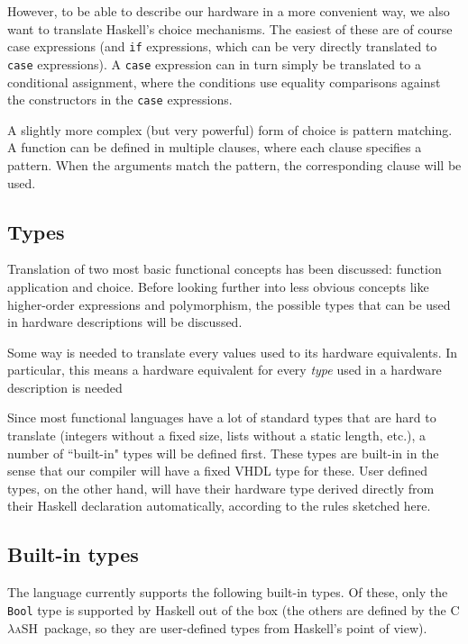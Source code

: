 \documentclass[conference,pdf,a4paper,10pt,final,twoside,twocolumn]{IEEEtran}
\def\CLaSH{\textsc{C$\lambda$aSH}}
\def\hs#1{\texttt{#1}}
\def\quote#1{``{#1}"}
\begin{document}
    However, to be able to describe our hardware in a more convenient
    way, we also want to translate Haskell's choice mechanisms. The
    easiest of these are of course case expressions (and \hs{if}
    expressions, which can be very directly translated to \hs{case}
    expressions). A \hs{case} expression can in turn simply be
    translated to a conditional assignment, where the conditions use
    equality comparisons against the constructors in the \hs{case}
    expressions.

    A slightly more complex (but very powerful) form of choice is
    pattern matching. A function can be defined in multiple clauses,
    where each clause specifies a pattern. When the arguments match the
    pattern, the corresponding clause will be used.

  \subsection{Types}
    Translation of two most basic functional concepts has been
    discussed: function application and choice. Before looking further
    into less obvious concepts like higher-order expressions and
    polymorphism, the possible types that can be used in hardware
    descriptions will be discussed.

    Some way is needed to translate every values used to its hardware
    equivalents. In particular, this means a hardware equivalent for
    every \emph{type} used in a hardware description is needed

    Since most functional languages have a lot of standard types that
    are hard to translate (integers without a fixed size, lists without
    a static length, etc.), a number of \quote{built-in} types will be
    defined first. These types are built-in in the sense that our
    compiler will have a fixed VHDL type for these. User defined types,
    on the other hand, will have their hardware type derived directly
    from their Haskell declaration automatically, according to the rules
    sketched here.

  \subsection{Built-in types}
    The language currently supports the following built-in types. Of these,
    only the \hs{Bool} type is supported by Haskell out of the box (the
    others are defined by the \CLaSH\ package, so they are user-defined types
    from Haskell's point of view).
\end{document}
